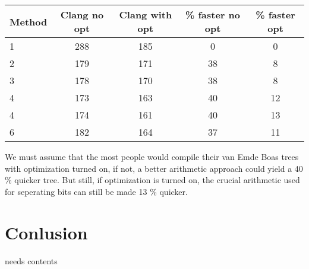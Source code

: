 \documentclass[oneside,11pt,openright]{report}
\begin{document}
\begin{center}
  \begin{tabular}{ l | c | c | c | c }
    Method & Clang no opt & Clang with opt & \% faster no opt & \% faster opt  \\ \hline
    1 & 288 & 185 & 0 & 0 \\ 
    2 & 179 & 171 & 38 & 8\\ 
    3 & 178 & 170 & 38 & 8 \\ 
    4 & 173 & 163 & 40 & 12\\ 
    4 & 174 & 161 & 40 & 13 \\ 
    6 & 182 & 164 & 37 & 11 \\ 
  \end{tabular}
\end{center}

We must assume that the most people would compile their van Emde Boas trees with optimization turned on, if not, a better arithmetic approach could yield a 40 \% quicker tree. But still, if optimization is turned on, the crucial arithmetic used for seperating bits can still be made 13 \% quicker.

\chapter{Conlusion}

needs contents



 

\end{document}

